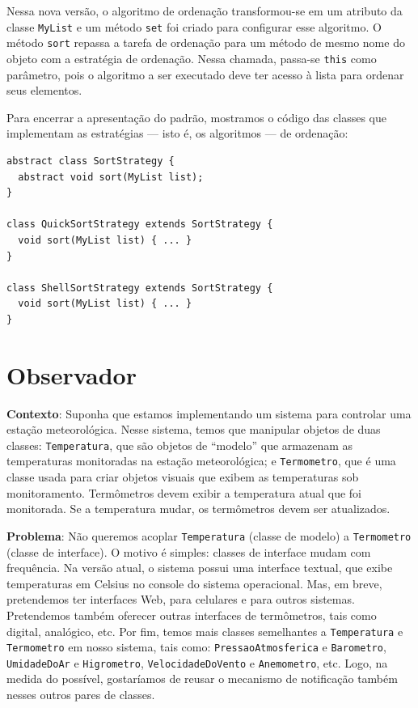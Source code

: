 \documentclass[
  11pt,
  twoside]{book}
\newcommand{\passthrough}[1]{#1}
\begin{document}
Nessa nova versão, o algoritmo de ordenação transformou-se em um
atributo da classe \passthrough{\lstinline!MyList!} e um método
\passthrough{\lstinline!set!} foi criado para configurar esse algoritmo.
O método \passthrough{\lstinline!sort!} repassa a tarefa de ordenação
para um método de mesmo nome do objeto com a estratégia de ordenação.
Nessa chamada, passa-se \passthrough{\lstinline!this!} como parâmetro,
pois o algoritmo a ser executado deve ter acesso à lista para ordenar
seus elementos.

Para encerrar a apresentação do padrão, mostramos o código das classes
que implementam as estratégias --- isto é, os algoritmos --- de
ordenação:

\begin{lstlisting}
abstract class SortStrategy {
  abstract void sort(MyList list);
}

class QuickSortStrategy extends SortStrategy {
  void sort(MyList list) { ... }
}

class ShellSortStrategy extends SortStrategy {
  void sort(MyList list) { ... }
}
\end{lstlisting}

\hypertarget{observador}{%
\section{Observador}\label{observador}}

 

\textbf{Contexto}: Suponha que estamos implementando um sistema para
controlar uma estação meteorológica. Nesse sistema, temos que manipular
objetos de duas classes: \passthrough{\lstinline!Temperatura!}, que são
objetos de ``modelo'' que armazenam as temperaturas monitoradas na
estação meteorológica; e \passthrough{\lstinline!Termometro!}, que é uma
classe usada para criar objetos visuais que exibem as temperaturas sob
monitoramento. Termômetros devem exibir a temperatura atual que foi
monitorada. Se a temperatura mudar, os termômetros devem ser
atualizados.

\textbf{Problema}: Não queremos acoplar
\passthrough{\lstinline!Temperatura!} (classe de modelo) a
\passthrough{\lstinline!Termometro!} (classe de interface). O motivo é
simples: classes de interface mudam com frequência. Na versão atual, o
sistema possui uma interface textual, que exibe temperaturas em Celsius
no console do sistema operacional. Mas, em breve, pretendemos ter
interfaces Web, para celulares e para outros sistemas. Pretendemos
também oferecer outras interfaces de termômetros, tais como digital,
analógico, etc. Por fim, temos mais classes semelhantes a
\passthrough{\lstinline!Temperatura!} e
\passthrough{\lstinline!Termometro!} em nosso sistema, tais como:
\passthrough{\lstinline!PressaoAtmosferica!} e
\passthrough{\lstinline!Barometro!},
\passthrough{\lstinline!UmidadeDoAr!} e
\passthrough{\lstinline!Higrometro!},
\passthrough{\lstinline!VelocidadeDoVento!} e
\passthrough{\lstinline!Anemometro!}, etc. Logo, na medida do possível,
gostaríamos de reusar o mecanismo de notificação também nesses outros
pares de classes.
\end{document}
